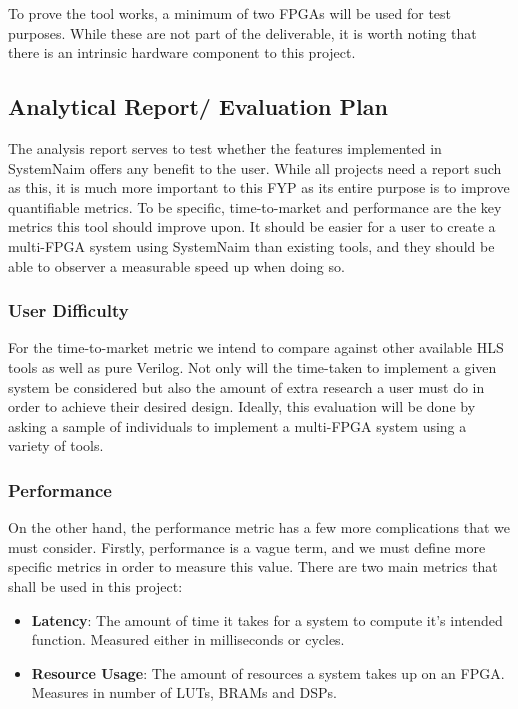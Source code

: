 To prove the tool works, a minimum of two FPGAs will be used for test purposes. While these are not part of the deliverable, it is worth noting that there is an intrinsic hardware component to this project.


\subsection{Analytical Report/ Evaluation Plan}

The analysis report serves to test whether the features implemented in SystemNaim offers any benefit to the user. While all projects need a report such as this, it is much more important to this FYP as its entire purpose is to improve quantifiable metrics. To be specific, time-to-market and performance are the key metrics this tool should improve upon. It should be easier for a user to create a multi-FPGA system using SystemNaim than existing tools, and they should be able to observer a measurable speed up when doing so.

\subsubsection{User Difficulty}
For the time-to-market metric we intend to compare against other available HLS tools as well as pure Verilog. Not only will the time-taken to implement a given system be considered but also the amount of extra research a user must do in order to achieve their desired design. Ideally, this evaluation will be done by asking a sample of individuals to implement a multi-FPGA system using a variety of tools.

\subsubsection{Performance}
On the other hand, the performance metric has a few more complications that we must consider. Firstly, performance is a vague term, and we must define more specific metrics in order to measure this value. There are two main metrics that shall be used in this project: 

\begin{itemize}
    \item \textbf{Latency}: The amount of time it takes for a system to compute it's intended function. Measured either in milliseconds or cycles.
    \item \textbf{Resource Usage}: The amount of resources a system takes up on an FPGA. Measures in number of LUTs, BRAMs and DSPs.
\end{itemize}


